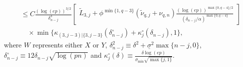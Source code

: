 \documentclass[aos]{imsart}
\begin{document}
\begin{appendix}
\begin{lemma}
\begin{equation*}
\begin{aligned}
        & \leq C \frac{(\log(ep))^{3/2}}{\delta_{n-j}^3} \left[ \begin{aligned}
            \tilde{L}_{3,j}
            + \phi^{\min\{1, q-3\}} (\tilde\nu_{q,j} + \nu_{q,n}) \frac{ {(\log(ep))}^{\max\{0, q-4\}/2}}{(\delta_{n-j}/\alpha)^{\max\{0, q-4\}}}
        \end{aligned} \right] \\
        & \quad \times \min\{\kappa_{(3,j-3)|\{3,j-3\}}(\delta_{n-j}^\circ) + \kappa^\circ_{j}(\delta_{n-j}), 1\},
    \end{aligned}
    \end{equation*}
    where $W$ represents either $X$ or $Y$, $\delta_{n-j}^2 \equiv \delta^2 + \underline{\sigma}^2 \max\{n-j,0\}$, $\delta^\circ_{n-j} \equiv 12 \delta_{n-j} \sqrt{\log(pn)}$ and $\kappa^\circ_{j}(\delta) \equiv \frac{\delta \log(ep)}{\sigma_{\min} \sqrt{\max\{j, 1\}}}$.
\end{lemma}








\end{appendix}
\end{document}
